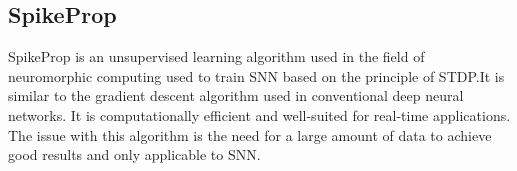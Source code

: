 \subsection{SpikeProp}
SpikeProp\cite{spikeprop} is an unsupervised learning algorithm used in the
field of neuromorphic computing used to train SNN based on the principle of
STDP.\@ It is similar to the gradient descent algorithm used in conventional deep
neural networks. It is computationally efficient and well-suited for real-time
applications. The issue with this algorithm is the need for a large amount of
data to achieve good results and only applicable to SNN.\@
